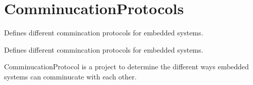 \hypertarget{group___comminucation_protocols}{}\section{Comminucation\+Protocols}
\label{group___comminucation_protocols}


Defines different commincation protocols for embedded systems.  


Defines different commincation protocols for embedded systems. 

Comminucation\+Protocol is a project to determine the different ways embedded systems can comminucate with each other. 